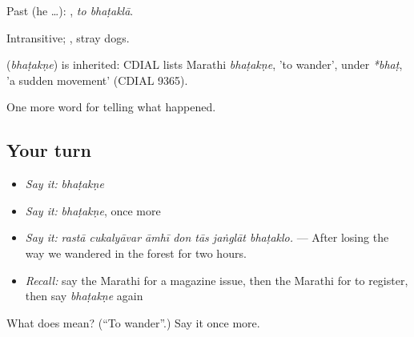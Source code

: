 Past (he …):  , \emph{to bhaṭaklā}.

Intransitive;  , stray dogs.

\begin{cousinweb}
\textbf{} (\emph{bhaṭakṇe}) is inherited: CDIAL lists Marathi \emph{bhaṭakṇe}, 'to wander', under \emph{*bhaṭ}, 'a sudden movement' (CDIAL 9365).
\end{cousinweb}

\begin{grammarlens}[title={What you've built}]
One more word for telling what happened.
\end{grammarlens}

\subsection*{Your turn}
\begin{itemize}
\raggedright
  \item \emph{Say it:} \emph{bhaṭakṇe}
  \item \emph{Say it:} \emph{bhaṭakṇe}, once more
  \item \emph{Say it:} \emph{rastā cukalyāvar āmhī don tās jaṅglāt bhaṭaklo.} — After losing the way we wandered in the forest for two hours.
  \item \emph{Recall:} say the Marathi for a magazine issue, then the Marathi for to register, then say \emph{bhaṭakṇe} again
\end{itemize}

\begin{tcolorbox}[breakable,colback=teal!4,colframe=teal!35!black,title={Before you move on}]
What does  mean? (\textquotedblleft{}To wander\textquotedblright{}.) Say it once more.
\end{tcolorbox}

